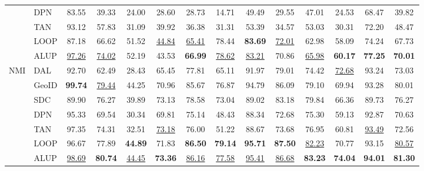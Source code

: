 \begin{tabular}{llcccccccccccc}
&DPN&83.55&39.33&24.00&28.60&28.73&14.71&49.49&29.55&47.01&24.53&68.47&39.82\\
&TAN&93.12&57.83&31.09&39.92&36.38&31.31&53.39&34.57&53.03&30.31&72.20&48.47\\
&LOOP&87.18&66.62&51.52&\underline{44.84}&\underline{65.41}&78.44&\textbf{83.69}&\underline{72.01}&62.98&58.09&74.24&67.73\\
&ALUP&\underline{97.26}&\underline{74.02}&52.19&43.53&\textbf{66.99}&\underline{78.62}&\underline{83.21}&70.86&\underline{65.98}&\textbf{60.17}&\textbf{77.25}&\textbf{70.01}\\
\cline{1-14}
\multirow[t]{7}{*}{NMI}&DAL&92.70&62.49&28.43&65.45&77.81&65.11&91.97&79.01&74.42&\underline{72.68}&93.24&73.03\\
&GeoID&\textbf{99.74}&\underline{79.44}&44.25&70.96&85.67&76.87&94.79&86.09&79.10&69.94&93.28&80.01\\
&SDC&89.90&76.27&39.89&73.13&78.58&73.04&89.02&83.18&79.84&66.36&89.73&76.27\\
&DPN&95.33&69.54&30.34&69.81&75.14&48.43&88.34&72.68&75.30&59.13&92.87&70.63\\
&TAN&97.35&74.31&32.51&\underline{73.18}&76.00&51.22&88.67&73.68&76.95&60.81&\underline{93.49}&72.56\\
&LOOP&96.67&77.89&\textbf{44.89}&71.83&\textbf{86.50}&\textbf{79.14}&\textbf{95.71}&\textbf{87.50}&\underline{82.23}&70.77&93.15&\underline{80.57}\\
&ALUP&\underline{98.69}&\textbf{80.74}&\underline{44.45}&\textbf{73.36}&\underline{86.16}&\underline{77.58}&\underline{95.41}&\underline{86.68}&\textbf{83.23}&\textbf{74.04}&\textbf{94.01}&\textbf{81.30}\\
\cline{1-14}
\bottomrule
\end{tabular}
